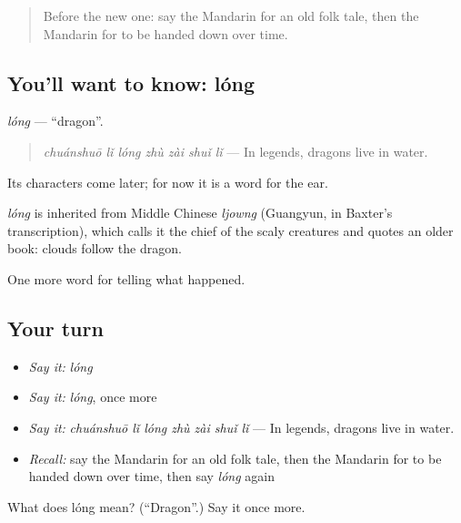\label{lesson:ZH-C328-long}



\begin{quote}
Before the new one: say the Mandarin for an old folk tale, then the Mandarin for to be handed down over time.
\end{quote}

\subsection*{You'll want to know: lóng}
\emph{lóng} — \textquotedblleft{}dragon\textquotedblright{}.

\begin{quote}
\emph{chuánshuō lǐ lóng zhù zài shuǐ lǐ} — In legends, dragons live in water.
\end{quote}

Its characters come later; for now it is a word for the ear.

\begin{cousinweb}
\emph{lóng} is inherited from Middle Chinese \emph{ljowng} (Guangyun, in Baxter's transcription), which calls it the chief of the scaly creatures and quotes an older book: clouds follow the dragon.
\end{cousinweb}

\begin{grammarlens}[title={What you've built}]
One more word for telling what happened.
\end{grammarlens}

\subsection*{Your turn}
\begin{itemize}
\raggedright
  \item \emph{Say it:} \emph{lóng}
  \item \emph{Say it:} \emph{lóng}, once more
  \item \emph{Say it:} \emph{chuánshuō lǐ lóng zhù zài shuǐ lǐ} — In legends, dragons live in water.
  \item \emph{Recall:} say the Mandarin for an old folk tale, then the Mandarin for to be handed down over time, then say \emph{lóng} again
\end{itemize}

\begin{tcolorbox}[breakable,colback=teal!4,colframe=teal!35!black,title={Before you move on}]
What does lóng mean? (\textquotedblleft{}Dragon\textquotedblright{}.) Say it once more.
\end{tcolorbox}
